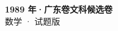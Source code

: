 \documentclass[zihao=-4, a4paper]{ctexart}
\begin{document}
\begin{center}
  {\Large\bfseries 1989 年·广东卷文科候选卷}\\[4pt]
  {\large 数学 · 试题版}
\end{center}
\medskip
{}

\end{document}
